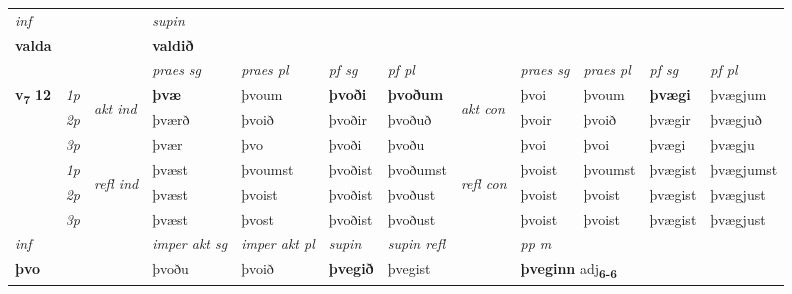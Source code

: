 \begin{longtable}[l]{X>{\footnotesize\itshape}llXXXXlXXXX}
   {\textit{inf}} & &      & \textit{supin}   \\*
  {\textbf{valda}} & &      &  \textbf{valdið}   \\*

\midrule

 & &   & \textit{praes sg}  & \textit{praes pl}    & \textit{ pf sg} & \textit{pf pl} & & \textit{praes sg}  & \textit{praes pl}    & \textit{pf sg} & \textit{pf pl }  \\ \cmidrule{4-7} \cmidrule{9-12}
 \multirow{2}{*}{{{\textbf{v{\textsubscript{7}}} \Large{\textbf{12}}}}}  & 1p & \multirow{3}{*}{\begin{turn}{90}\textit{akt ind}\end{turn}} & \textbf{þvæ} & þvoum & \textbf{þvoði} & \textbf{þvoðum} & \multirow{3}{*}{\begin{turn}{90}\textit{akt con}\end{turn}} &þvoi & þvoum & \textbf{þvægi} & þvægjum\\*
 & 2p &  &  þværð  & þvoið & þvoðir & þvoðuð & & þvoir & þvoið & þvægir & þvægjuð \\*
 & 3p &  & þvær & þvo & þvoði & þvoðu & & þvoi & þvoi& þvægi & þvægju \\*
\cmidrule{4-7} \cmidrule{9-12}
 & 1p & \multirow{3}{*}{\begin{turn}{90}\textit{refl ind}\end{turn}}  & þvæst & þvoumst & þvoðist & þvoðumst & \multirow{3}{*}{\begin{turn}{90}\textit{refl con}\end{turn}}  &þvoist & þvoumst & þvægist & þvægjumst \\*
 & 2p &  & þvæst & þvoist & þvoðist & þvoðust & &þvoist & þvoist & þvægist & þvægjust \\*
 & 3p  & & þvæst & þvost & þvoðist & þvoðust & & þvoist & þvoist& þvægist & þvægjust \\*
\cmidrule{4-7} \cmidrule{9-12}

   {\textit{inf}} & &  & \textit{imper akt sg} & \textit{imper akt pl}    & \textit{supin} & \textit{supin refl} && \textit{pp m} \\*
  {\textbf{þvo}} & && þvoðu  & þvoið    &  \textbf{þvegið} & þvegist && \multicolumn{2}{l}{\textbf{þveginn} adj\textbf{\textsubscript{6-6}}} \\*


\end{longtable}

